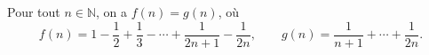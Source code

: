 Pour tout $n \in \mathbb{N}$, on a $f(n) = g(n)$, où
\[ f(n) = 1 - \frac{1}{2} + \frac{1}{3} - \cdots + \frac{1}{2n + 1} - \frac{1}{2n},\qquad g(n) = \frac{1}{n + 1} + \cdots + \frac{1}{2n}. \]
